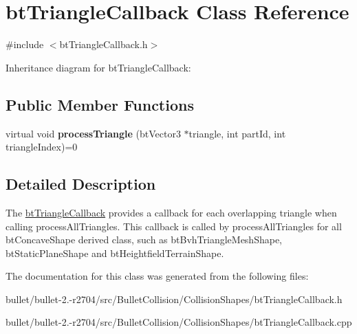 \hypertarget{classbt_triangle_callback}{\section{bt\+Triangle\+Callback Class Reference}
\label{classbt_triangle_callback}
}


{\ttfamily \#include $<$bt\+Triangle\+Callback.\+h$>$}



Inheritance diagram for bt\+Triangle\+Callback\+:
\subsection*{Public Member Functions}
\begin{DoxyCompactItemize}
\item 
\hypertarget{classbt_triangle_callback_a3850755f2c1fd71c4ca5877db1e6f891}{virtual void {\bfseries process\+Triangle} (bt\+Vector3 $\ast$triangle, int part\+Id, int triangle\+Index)=0}\label{classbt_triangle_callback_a3850755f2c1fd71c4ca5877db1e6f891}

\end{DoxyCompactItemize}


\subsection{Detailed Description}
The \hyperlink{classbt_triangle_callback}{bt\+Triangle\+Callback} provides a callback for each overlapping triangle when calling process\+All\+Triangles. This callback is called by process\+All\+Triangles for all bt\+Concave\+Shape derived class, such as bt\+Bvh\+Triangle\+Mesh\+Shape, bt\+Static\+Plane\+Shape and bt\+Heightfield\+Terrain\+Shape. 

The documentation for this class was generated from the following files\+:\begin{DoxyCompactItemize}
\item 
bullet/bullet-\/2.-\/r2704/src/\+Bullet\+Collision/\+Collision\+Shapes/bt\+Triangle\+Callback.\+h\item 
bullet/bullet-\/2.-\/r2704/src/\+Bullet\+Collision/\+Collision\+Shapes/bt\+Triangle\+Callback.\+cpp\end{DoxyCompactItemize}
